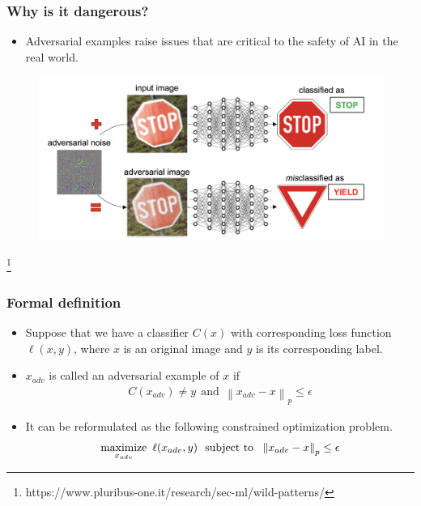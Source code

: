 \documentclass[10pt,mathserif]{beamer}
\newcommand{\norm}[1]{\left\lVert#1\right\rVert}
\begin{document}
\begin{frame}
\frametitle{Why is it dangerous?}
\vspace{1em}
\begin{itemize}\itemsep=12pt
    \item Adversarial examples raise issues that are critical to the safety of AI in the real world.
\end{itemize}
\vspace{-1em}
\begin{figure}
    \centering
    \includegraphics[scale=0.20]{figures/adversarial_example_stop_sign.png}
    \label{fig:adversarial_example}
\end{figure}
\footnote{\scriptsize https://www.pluribus-one.it/research/sec-ml/wild-patterns/}
\end{frame}

\begin{frame}
\frametitle{Formal definition}
\begin{itemize}\itemsep=12pt
    \item Suppose that we have a classifier $C(x)$ with corresponding loss function $\ell(x, y)$, where $x$ is an original image and $y$ is its corresponding label.\pause
    \item $x_{adv}$ is called an adversarial example of $x$ if
    \begin{align*}
    C(x_{adv}) \neq y ~~ \text{and} ~~ \norm{x_{adv}-x}_p \le \epsilon
    \end{align*}\pause
    \vspace{-1.5em}
    \item It can be reformulated as the following constrained optimization problem.
    \begin{align*}
    \maximize_{x_{adv}}~\ell(x_{adv}, y) ~~ \text{subject to} ~~ \norm{x_{adv}-x}_p \le \epsilon
    \end{align*}
    \vspace{-1.5em}
\end{itemize}
\end{frame}
\end{document}
